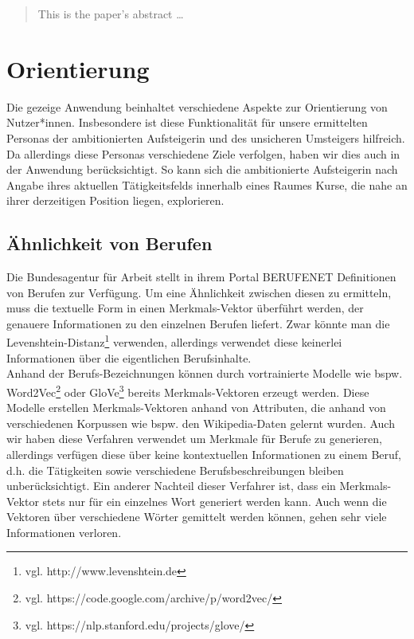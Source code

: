 \documentclass[10pt]{article}
\begin{document}
\maketitle

\begin{abstract}
This is the paper's abstract \ldots
\end{abstract}

\section{Orientierung}

Die gezeige Anwendung beinhaltet verschiedene Aspekte zur Orientierung von Nutzer*innen. Insbesondere ist diese Funktionalität für unsere ermittelten Personas der ambitionierten Aufsteigerin und des unsicheren Umsteigers hilfreich. Da allerdings diese Personas verschiedene Ziele verfolgen, haben wir dies auch in der Anwendung berücksichtigt. So kann sich die ambitionierte Aufsteigerin nach Angabe ihres aktuellen Tätigkeitsfelds innerhalb eines Raumes Kurse, die nahe an ihrer derzeitigen Position liegen, explorieren.

\subsection{Ähnlichkeit von Berufen}

Die Bundesagentur für Arbeit stellt in ihrem Portal BERUFENET Definitionen von Berufen zur Verfügung. Um eine Ähnlichkeit zwischen diesen zu ermitteln, muss die textuelle Form in einen Merkmals-Vektor überführt werden, der genauere Informationen zu den einzelnen Berufen liefert. Zwar könnte man die Levenshtein-Distanz\footnote{vgl. http://www.levenshtein.de} verwenden, allerdings verwendet diese keinerlei Informationen über die eigentlichen Berufsinhalte.\\

 Anhand der Berufs-Bezeichnungen können durch vortrainierte Modelle wie bspw. Word2Vec\footnote{vgl. https://code.google.com/archive/p/word2vec/} oder GloVe\footnote{vgl. https://nlp.stanford.edu/projects/glove/} bereits Merkmals-Vektoren erzeugt werden. Diese Modelle erstellen Merkmals-Vektoren anhand von Attributen, die anhand von verschiedenen Korpussen wie bspw. den Wikipedia-Daten gelernt wurden. Auch wir haben diese Verfahren verwendet um Merkmale für Berufe zu generieren, allerdings verfügen diese über keine kontextuellen Informationen zu einem Beruf, d.h. die Tätigkeiten sowie verschiedene Berufsbeschreibungen bleiben unberücksichtigt. Ein anderer Nachteil dieser Verfahrer ist, dass ein Merkmals-Vektor stets nur für ein einzelnes Wort generiert werden kann. Auch wenn die Vektoren über verschiedene Wörter gemittelt werden können, gehen sehr viele Informationen verloren.\\
\end{document}
